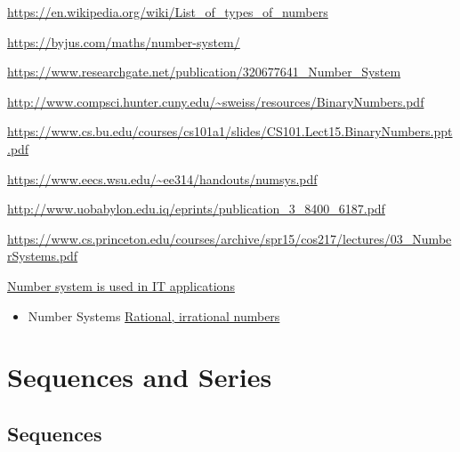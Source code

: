 \documentclass[]{book}
\providecommand{\tightlist}{%
  \setlength{\itemsep}{0pt}\setlength{\parskip}{0pt}}
\begin{document}
\url{https://en.wikipedia.org/wiki/List_of_types_of_numbers}

\url{https://byjus.com/maths/number-system/}

\url{https://www.researchgate.net/publication/320677641_Number_System}

\url{http://www.compsci.hunter.cuny.edu/~sweiss/resources/BinaryNumbers.pdf}

\url{https://www.cs.bu.edu/courses/cs101a1/slides/CS101.Lect15.BinaryNumbers.ppt.pdf}

\url{https://www.eecs.wsu.edu/~ee314/handouts/numsys.pdf}

\url{http://www.uobabylon.edu.iq/eprints/publication_3_8400_6187.pdf}

\url{https://www.cs.princeton.edu/courses/archive/spr15/cos217/lectures/03_NumberSystems.pdf}

\href{https://www.ukessays.com/essays/social-work/number-system-is-used-in-it-applications-social-work-essay.php}{Number system is used in IT applications}

\begin{itemize}
\tightlist
\item
  Number Systems \href{https://www.topperlearning.com/ncert-solutions/cbse-class-9-mathematics/mathematics-ix/number-systems}{Rational, irrational numbers}
\end{itemize}

\hypertarget{sequences-and-series}{%
\chapter{Sequences and Series}\label{sequences-and-series}}

\hypertarget{sequences}{%
\section{Sequences}\label{sequences}}
\end{document}
